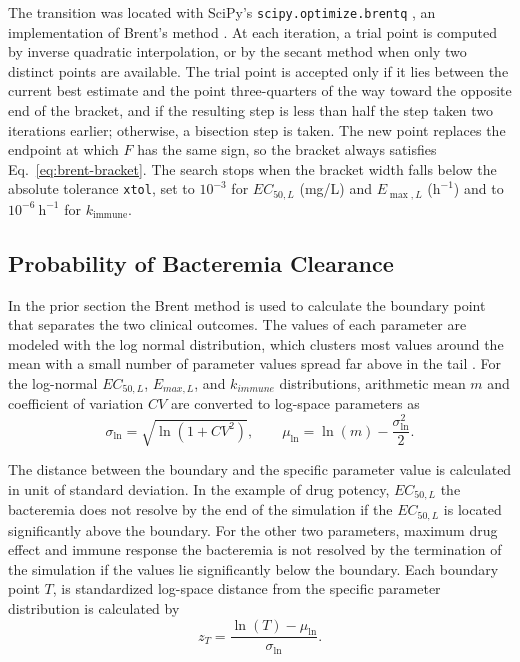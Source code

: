 \documentclass[utf8]{FrontiersinHarvard} %
\begin{document}
The transition was located with SciPy's \texttt{scipy.optimize.brentq}
\citep{2020SciPy-NMeth}, an implementation of Brent's method
\citep{Brent1971,brent1973}. At each iteration, a trial point is computed by
inverse quadratic interpolation, or by the secant method when only two
distinct points are available. The trial point is accepted only if it lies
between the current best estimate and the point three-quarters of the way
toward the opposite end of the bracket, and if the resulting step is less than
half the step taken two iterations earlier; otherwise, a bisection step is
taken. The new point replaces the endpoint at which $F$ has the same sign, so
the bracket always satisfies Eq.~\eqref{eq:brent-bracket}. The search stops
when the bracket width falls below the absolute tolerance \texttt{xtol}, set
to $10^{-3}$ for $EC_{50,L}$ (mg/L) and $E_{\max,L}$ ($\mathrm{h}^{-1}$) and to
$10^{-6}~\mathrm{h}^{-1}$ for $k_{\mathrm{immune}}$.

\subsection{Probability of Bacteremia Clearance}
In the prior section the Brent method is used to calculate the boundary point that separates the two clinical outcomes.
The values of each parameter are modeled with the log normal distribution, which clusters most values around
the mean with a small number of parameter values spread far above in the tail \citep{limpert2001lognormal}. For the log-normal $EC_{50,L}$, $E_{max,L}$, and $k_{immune}$ distributions, arithmetic mean $m$ and coefficient of variation $CV$ are converted to log-space
parameters as
\begin{equation}
\sigma_{\ln}=\sqrt{\ln(1+CV^2)}, \qquad
\mu_{\ln}=\ln(m)-\frac{\sigma_{\ln}^{2}}{2}.
\label{eq:lognormal-parameters}
\end{equation}

The distance between the boundary and the specific parameter value is calculated in unit of standard deviation.
In the example of drug potency, $EC_{50,L}$ the bacteremia does not resolve by the end of the simulation if the $EC_{50,L}$ is
located significantly above the boundary. For the other two parameters, maximum drug effect and immune response
the bacteremia is not resolved by the termination of the simulation if the values lie significantly below the boundary.
Each boundary point $T$, is standardized log-space distance from the
specific parameter distribution is calculated by
\begin{equation}
z_T=\frac{\ln(T)-\mu_{\ln}}{\sigma_{\ln}}.
\label{eq:lognormal-switch-z}
\end{equation}
\end{document}
